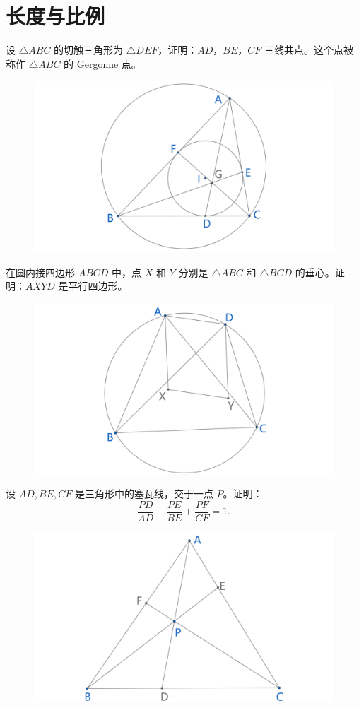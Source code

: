 \part{长度与比例}

\begin{exercise}
设 $\triangle ABC$ 的切触三角形为 $\triangle DEF$，证明：${AD}$，${BE}$，${CF}$ 三线共点。这个点被称作 $\triangle ABC$ 的 Gergonne 点。
\end{exercise}
\begin{figure}[H]
    \centering
    \includegraphics[width=0.7\linewidth]{figures/exercises/316.png}
\end{figure}


\begin{exercise}
在圆内接四边形 $ABCD$ 中，点 $X$ 和 $Y$ 分别是 $\triangle ABC$ 和 $\triangle BCD$ 的垂心。证明：$AXYD$ 是平行四边形。
\end{exercise}
\begin{figure}[H]
    \centering
    \includegraphics[width=0.7\linewidth]{figures/exercises/317.png}
\end{figure}


\newpage 
\begin{exercise}
    设 $AD, BE, CF$ 是三角形中的塞瓦线，交于一点 $P$。证明：
    $$
    \frac{PD}{AD} + \frac{PE}{BE} + \frac{PF}{CF} = 1.
    $$
\end{exercise}
\begin{figure}[H]
    \centering
    \includegraphics[width=0.7\linewidth]{figures/exercises/318.png}
\end{figure}

